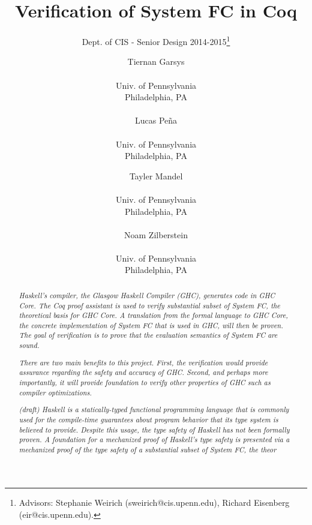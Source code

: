 \documentclass{sig-alternate}
\begin{document}
 

\title{Verification of System FC in Coq}
\subtitle{Dept. of CIS - Senior Design 2014-2015\thanks{Advisors: Stephanie Weirich (sweirich@cis.upenn.edu), Richard Eisenberg (eir@cis.upenn.edu).}}
\author{
  Tiernan Garsys \\  \\ Univ. of Pennsylvania \\ Philadelphia, PA\\\\
  Lucas Pe\~{n}a \\  \\ Univ. of Pennsylvania \\ Philadelphia, PA
  \and
  Tayler Mandel \\  \\ Univ. of Pennsylvania \\ Philadelphia, PA\\\\
  Noam Zilberstein \\  \\ Univ. of Pennsylvania \\ Philadelphia, PA
}
\date{}
\maketitle

\begin{abstract}
  \textit{
Haskell's compiler, the Glasgow Haskell Compiler (GHC), generates code in GHC Core. The Coq proof assistant is used to verify substantial subset of System FC, the theoretical basis for GHC Core. A translation from the formal language to GHC Core, the concrete implementation of System FC that is used in GHC, will then be proven. The goal of verification is to prove that the evaluation semantics of System FC are sound.
  }

  \textit{
There are two main benefits to this project. First, the verification would provide assurance regarding the safety and accuracy of GHC. Second, and perhaps more importantly, it will provide foundation to verify other properties of GHC such as compiler optimizations.
 }

\textit{
(draft) Haskell is a statically-typed functional programming language that is commonly used for the compile-time guarantees about program behavior that its type system is believed to provide. Despite this usage, the type safety of  Haskell has not been formally proven. A foundation for a mechanized proof of Haskell's type safety is presented via a mechanized proof of the type safety of a substantial subset of System FC, the theor
 }
\end{abstract}
\end{document}
